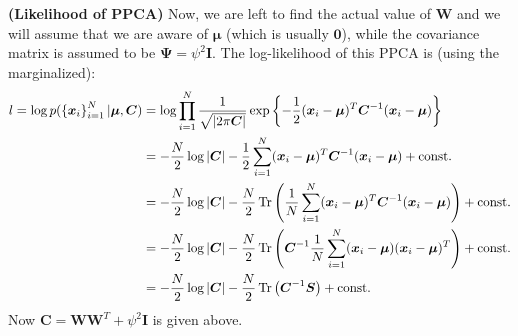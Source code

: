 \begin{remark}{\textbf{(Likelihood of PPCA)}}
    Now, we are left to find the actual value of $\boldsymbol W$ and we will assume that we are aware of $\boldsymbol \mu$ (which is usually $\boldsymbol 0$), while the covariance matrix is assumed to be $\boldsymbol \Psi = \psi^2 \boldsymbol I$. The log-likelihood of this PPCA is (using the marginalized):
    \begin{equation*}
    \begin{aligned}
        l = \log p(\left\{ \boldsymbol x_i \right\}^N_{i=1} | \boldsymbol \mu, \boldsymbol C) &= \log \prod^N_{i=1} \frac{1}{\sqrt{|2\pi\boldsymbol C|}}\exp\left\{ -\frac{1}{2}(\boldsymbol x_i - \boldsymbol \mu)^T\boldsymbol C^{-1}(\boldsymbol x_i - \boldsymbol \mu) \right\} \\
        &= -\frac{N}{2}\log\left| \boldsymbol C \right| -\frac{1}{2}\sum^N_{i=1}(\boldsymbol x_i - \boldsymbol \mu)^T\boldsymbol C^{-1}(\boldsymbol x_i - \boldsymbol \mu) + \text{const.} \\
        &= -\frac{N}{2}\log\left| \boldsymbol C \right| -\frac{N}{2}\operatorname{Tr}\left( \frac{1}{N}\sum^N_{i=1}(\boldsymbol x_i - \boldsymbol \mu)^T\boldsymbol C^{-1}(\boldsymbol x_i - \boldsymbol \mu) \right) + \text{const.} \\
        &= -\frac{N}{2}\log\left| \boldsymbol C \right| -\frac{N}{2}\operatorname{Tr}\left( \boldsymbol C^{-1}\frac{1}{N}\sum^N_{i=1}(\boldsymbol x_i - \boldsymbol \mu)(\boldsymbol x_i - \boldsymbol \mu)^T \right) + \text{const.} \\
        &= -\frac{N}{2}\log\left| \boldsymbol C \right| -\frac{N}{2}\operatorname{Tr}\left( \boldsymbol C^{-1}\boldsymbol S \right) + \text{const.} \\
    \end{aligned}
    \end{equation*}
    Now $\boldsymbol C = \boldsymbol W\boldsymbol W^T + \psi^2\boldsymbol I$ is given above. 
\end{remark}

